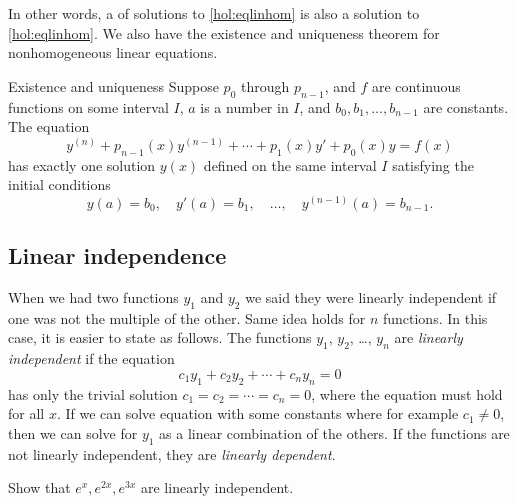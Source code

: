 In other words, a \emph{} of solutions
to \eqref{hol:eqlinhom}
is also a solution to \eqref{hol:eqlinhom}.
We also have the existence and uniqueness theorem for nonhomogeneous linear
equations.

\begin{theorem1}{Existence and uniqueness}
Suppose $p_0$ through $p_{n-1}$, and $f$ are continuous functions
on some interval $I$,
$a$ is a number in $I$,
and $b_0, b_1, \ldots, b_{n-1}$ are constants.
The equation
\begin{equation*} %
y^{(n)} + p_{n-1}(x)y^{(n-1)} + \cdots + p_1(x) y' + p_0(x) y = f(x) 
\end{equation*}
has exactly one solution $y(x)$ defined on the same interval $I$
satisfying the initial conditions
\begin{equation*}
y(a) = b_0, \quad y'(a) = b_1, \quad \ldots, \quad y^{(n-1)}(a) = b_{n-1} .
\end{equation*}
\end{theorem1}

\subsection{Linear independence}

When we had two functions $y_1$ and $y_2$ we said they were linearly
independent if one was not the multiple of the other.  Same idea holds for
$n$ functions.  In this case, it is easier to state as follows. The functions
$y_1$, $y_2$, \ldots, $y_n$ are \emph{linearly independent} if
the equation
\begin{equation*}
c_1 y_1 + c_2 y_2 + \cdots + c_n y_n = 0 
\end{equation*}
has only the trivial solution $c_1 = c_2 = \cdots = c_n = 0$, where the
equation must hold for all $x$.  If we can
solve equation with some constants where for example $c_1 \not= 0$, then we
can solve for $y_1$ as a linear combination of the others.  If the functions
are not
linearly independent, they are \emph{linearly dependent}.

\begin{example}
Show that $e^x, e^{2x}, e^{3x}$ are linearly independent.
\end{example}

